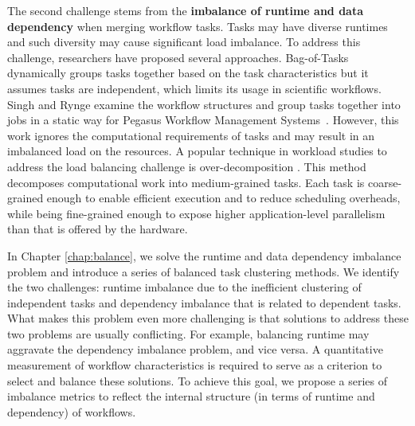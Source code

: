 The second challenge stems from the \textbf{imbalance of runtime and data dependency} when merging workflow tasks. Tasks may have diverse runtimes and such diversity may cause significant load imbalance. To address this challenge, researchers have proposed several approaches. Bag-of-Tasks \cite{Hussin2010, Celaya2010, Oprescu2010} dynamically groups tasks together based on the task characteristics but it assumes tasks are independent, which limits its usage in scientific workflows. Singh \cite{Singh2008} and Rynge \cite{Rynge2012} examine the workflow structures and group tasks together into jobs in a static way for Pegasus Workflow Management Systems~\cite{Deelman2004}.
However, this work ignores the computational requirements of tasks and may result in an imbalanced load on the resources. A popular technique in workload studies to address the load balancing challenge is over-decomposition \cite{Lifflander2012}. This method decomposes computational work into medium-grained tasks. Each task is coarse-grained enough to enable efficient execution and to reduce scheduling overheads, while being fine-grained enough to expose higher application-level parallelism than that is offered by the hardware. 

In Chapter \ref{chap:balance}, we solve the runtime and data dependency imbalance problem and introduce a series of {balanced task clustering} methods. 
We identify the two challenges: runtime imbalance due to the inefficient clustering of independent tasks and dependency imbalance that is related to dependent tasks. What makes this problem even more challenging is that solutions to address these two problems are usually conflicting. For example, balancing runtime may aggravate the dependency imbalance problem, and vice versa. A quantitative measurement of workflow characteristics is required to serve as a criterion to select and balance these solutions. To achieve this goal, we propose a series of imbalance metrics to reflect the internal structure (in terms of runtime and dependency) of workflows. 


